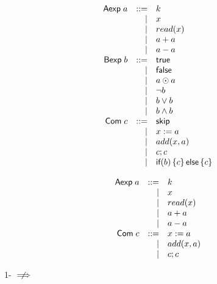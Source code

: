 \documentclass[xcolor={dvipsnames,svgnames,table}]{beamer}
\begin{document}
\begin{frame}{\imp{}}
  \footnotesize
  \[
    \begin{array}{rrl}
      \textsf{Aexp}\;
        a & ::= & k       \\
          & |   & x       \\
          & |   & read(x) \\
          & |   & a + a   \\
          & |   & a - a   \\
      \textsf{Bexp}\;
        b & ::= & \textsf{true}  \\
          & |   & \textsf{false} \\
          & |   & a \odot a      \\
          & |   & \lnot b        \\
          & |   & b \lor b       \\
          & |   & b \land b      \\
      \textsf{Com}\;
        c  & ::= & \textsf{skip}        \\
           & |   & x := a          \\
           & |   & add(x, a)       \\
           & |   & c; c            \\
           & |   & \textsf{if}(b)\left\{c\right\}\textsf{else}\left\{c\right\} \\
    \end{array}
  \]
\end{frame}

\begin{frame}{\wimp{}}
  \[
    \begin{array}{rrl}
      \textsf{Aexp}\;
        a & ::= & k       \\
          & |   & x       \\
          & |   & read(x) \\
          & |   & a + a   \\
          & |   & a - a   \\
      \textsf{Com}\;
        c  & ::= & x := a    \\
           & |   & add(x, a) \\
           & |   & c; c      \\
    \end{array}
  \]
\end{frame}

\begin{frame}
  \begin{center}
    \huge
    1-\iconfluence{} $\centernot\implies$ \iconfluence
  \end{center}
\end{frame}
\end{document}
